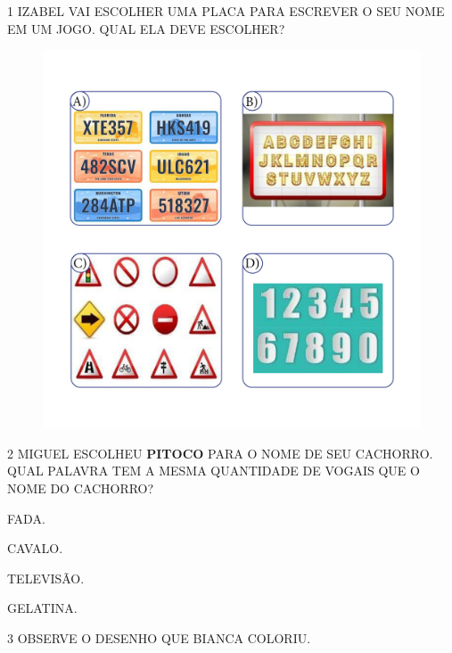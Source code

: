 \pagebreak

\num{1} IZABEL VAI ESCOLHER UMA PLACA PARA ESCREVER O SEU NOME EM UM JOGO. QUAL ELA DEVE ESCOLHER?

\begin{figure}[H]
\includegraphics[width=\textwidth]{media/image222a225.png}
\end{figure}

\num{2} MIGUEL ESCOLHEU \textbf{PITOCO} PARA O NOME DE SEU CACHORRO.
QUAL PALAVRA TEM A MESMA QUANTIDADE DE VOGAIS QUE O NOME DO CACHORRO?

\begin{escolha}
\item FADA.

\item CAVALO.

\item TELEVISÃO.

\item GELATINA.
\end{escolha}

\num{3} OBSERVE O DESENHO QUE BIANCA COLORIU.

